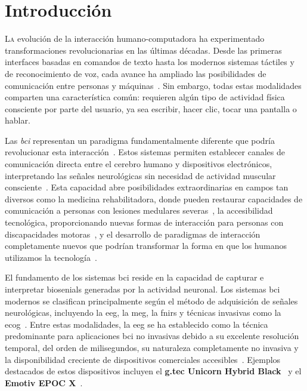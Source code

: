 \chapter{Introducción}
\label{chap:introduccion}

\lettrine{L}{a} evolución de la interacción humano-computadora ha experimentado transformaciones revolucionarias en las últimas décadas. Desde las primeras interfaces basadas en comandos de texto hasta los modernos sistemas táctiles y de reconocimiento de voz, cada avance ha ampliado las posibilidades de comunicación entre personas y máquinas~\cite{eeg_bci_review,wolpaw2002brain,dornhege2007toward,schalk2004bci2000}. Sin embargo, todas estas modalidades comparten una característica común: requieren algún tipo de actividad física consciente por parte del usuario, ya sea escribir, hacer clic, tocar una pantalla o hablar.

Las \textit{\acrfull{bci}} representan un paradigma fundamentalmente diferente que podría revolucionar esta interacción~\cite{eeg_bci_review,wolpaw2002brain,nicolas2012brain,lebedev2006brain,millán2004noninvasive}. Estos sistemas permiten establecer canales de comunicación directa entre el cerebro humano y dispositivos electrónicos, interpretando las señales neurológicas sin necesidad de actividad muscular consciente~\cite{dornhege2007toward,schalk2004bci2000,chavarriaga2017heading}. Esta capacidad abre posibilidades extraordinarias en campos tan diversos como la medicina rehabilitadora, donde pueden restaurar capacidades de comunicación a personas con lesiones medulares severas~\cite{wolpaw2002brain,hochberg2006neuronal,sellers2006noninvasive}, la accesibilidad tecnológica, proporcionando nuevas formas de interacción para personas con discapacidades motoras~\cite{birbaumer2006breaking}, y el desarrollo de paradigmas de interacción completamente nuevos que podrían transformar la forma en que los humanos utilizamos la tecnología~\cite{lebedev2006brain,millán2010combining}.

El fundamento de los sistemas \acrshort{bci} reside en la capacidad de capturar e interpretar \glspl{biosenial} generadas por la actividad neuronal. Los sistemas \acrshort{bci} modernos se clasifican principalmente según el método de adquisición de señales neurológicas, incluyendo la \acrfull{eeg}, la \acrfull{meg}, la \acrfull{fnirs} y técnicas invasivas como la \acrfull{ecog}~\cite{eeg_bci_review,dornhege2007toward,lotte2007review}. Entre estas modalidades, la \acrshort{eeg} se ha establecido como la técnica predominante para aplicaciones \acrshort{bci} no invasivas debido a su excelente resolución temporal, del orden de milisegundos, su naturaleza completamente no invasiva y la disponibilidad creciente de dispositivos comerciales accesibles~\cite{eeg_bci_review,wolpaw2002brain,dornhege2007toward,blankertz2010neurophysiological}. Ejemplos destacados de estos dispositivos incluyen el \textbf{g.tec Unicorn Hybrid Black}~\cite{gtec_unicorn} y el \textbf{Emotiv EPOC X}~\cite{emotiv_epoc_x}.

